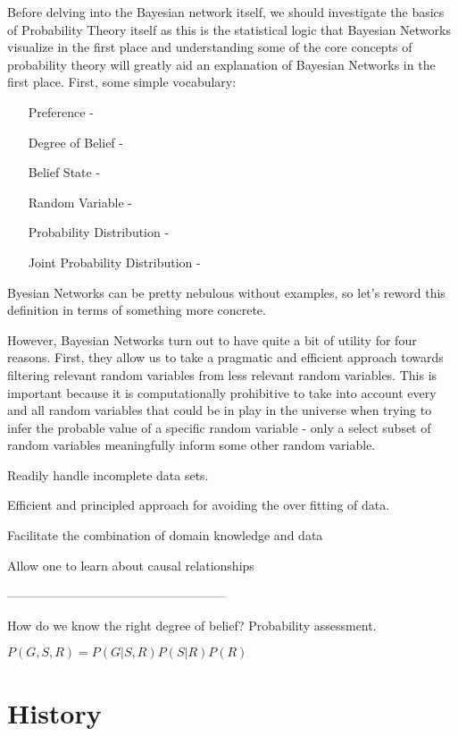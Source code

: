 \documentclass{article}
\begin{document}
Before delving into the Bayesian network itself, we should investigate the basics of Probability Theory itself as this is the statistical logic that Bayesian Networks visualize in the first place and understanding some of the core concepts of probability theory will greatly aid an explanation of Bayesian Networks in the first place. First, some simple vocabulary:

\begin{itemize}
  \item[Preference] -
  \item[Degree of Belief] -
  \item[Belief State] -
  \item[Random Variable] -
  \item[Probability Distribution] -
  \item[Joint Probability Distribution] -
\end{itemize}



Byesian Networks can be pretty nebulous without examples, so let's reword this definition in terms of something more concrete.

However, Bayesian Networks turn out to have quite a bit of utility for four reasons\cite{}. First, they allow us to take a pragmatic and efficient approach towards filtering relevant random variables from less relevant random variables. This is important because it is computationally prohibitive to take into account every and all random variables that could be in play in the universe when trying to infer the probable value of a specific random variable - only a select subset of random variables meaningfully inform some other random variable.

Readily handle incomplete data sets.


Efficient and principled approach for avoiding the over fitting of data.

Facilitate the combination of domain knowledge and data

Allow one to learn about causal relationships

-----------------------------------------------------

How do we know the right degree of belief? Probability assessment.

$P(G,S,R)=P(G|S,R)P(S|R)P(R)$

\section{History}
\end{document}
